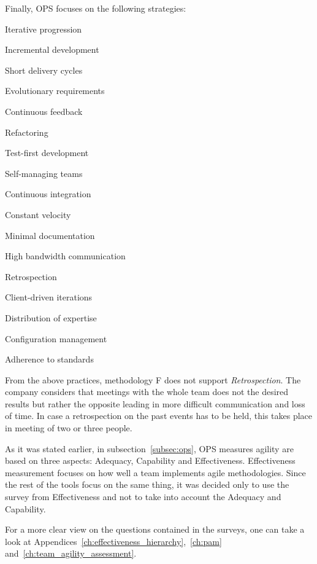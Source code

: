 Finally, OPS focuses on the following strategies:
\begin{inparaenum} [a\upshape)]
	\item Iterative progression
	\item Incremental development
	\item Short delivery cycles
	\item Evolutionary requirements
	\item Continuous feedback
	\item Refactoring
	\item Test-first development
	\item Self-managing teams
	\item Continuous integration
	\item Constant velocity
	\item Minimal documentation
	\item High bandwidth communication
	\item Retrospection
	\item Client-driven iterations
	\item Distribution of expertise
	\item Configuration management
	\item Adherence to standards

\end{inparaenum}
From the above practices, methodology F does not support \textit{Retrospection}. The company considers that meetings with the whole team does not the desired results but rather the opposite leading in more difficult communication and loss of time. In case a retrospection on the past events has to be held, this takes place in meeting of two or three people.


As it was stated earlier, in subsection~\ref{subsec:ops}, OPS measures agility are based on three aspects: Adequacy, Capability and Effectiveness. Effectiveness measurement focuses on how well a team implements agile methodologies. Since the rest of the tools focus on the same thing, it was decided only to use the survey from Effectiveness and not to take into account the Adequacy and Capability.

For a more clear view on the questions contained in the surveys, one can take a look at Appendices~\ref{ch:effectiveness_hierarchy},~\ref{ch:pam} and~\ref{ch:team_agility_assessment}.

